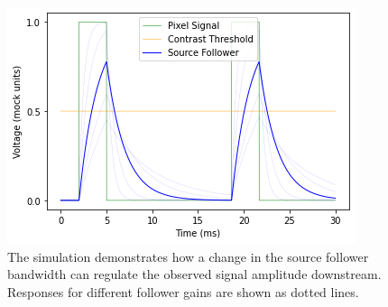 \begin{figure}
    \centering
    \includegraphics[width=.5\textwidth]{resources/plots/intensity-estimation/source_follower.png}
    \caption[Qualitative Simulation of the Source Follower with an Oscillating Signal]{The simulation demonstrates how a change in the source follower bandwidth can regulate the observed signal amplitude downstream. Responses for different follower gains are shown as dotted lines.}
    \label{fig:sourceFollower}
\end{figure}

% 

